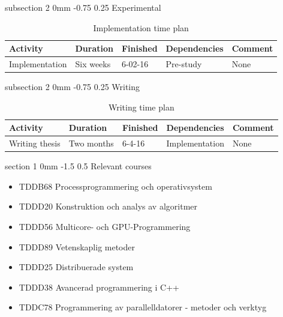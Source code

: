 \documentclass[a4paper,11pt]{article}
\makeatletter
\renewcommand{\section}{\@startsection
   {section}%
   {1}%
   {0mm}%
   {-1.5\baselineskip}%
   {0.5\baselineskip}%
   {\sffamily\bfseries\upshape\normalsize}}%
\renewcommand{\subsection}{\@startsection
   {subsection}%
   {2}%
   {0mm}%
   {-0.75\baselineskip}%
   {0.25\baselineskip}%
   {\rmfamily\normalfont\slshape\normalsize}}%
\makeatother
\begin{document}
\subsection{Experimental}
\begin{table}[H]
  \centering
  \begin{tabular}{|l|l|l|l|l|}
    \hline
    \textbf{Activity} & Duration & Finished & Dependencies & Comment  \\ \hline
    Implementation & Six weeks & 6-02-16 & Pre-study & None \\ \hline

  \end{tabular}
  \caption{Implementation time plan }
  \label{tab:funktion1}
\end{table}


\subsection{Writing}

\begin{table}[H]
  \centering
  \begin{tabular}{|l|l|l|l|l|}
    \hline
    \textbf{Activity} & Duration & Finished & Dependencies & Comment  \\ \hline
    Writing thesis & Two months & 6-4-16 & Implementation & None \\ \hline

  \end{tabular}
  \caption{Writing time plan }
  \label{tab:funktion1}
\end{table}

\section{Relevant courses}
\begin{itemize}
\item TDDB68	Processprogrammering och operativsystem
\item TDDD20	Konstruktion och analys av algoritmer
\item TDDD56	Multicore- och GPU-Programmering
\item TDDD89	Vetenskaplig metoder
\item TDDD25 	Distribuerade system
\item TDDD38 	Avancerad programmering i C++
\item TDDC78 	Programmering av parallelldatorer - metoder och verktyg
\end{itemize}
\end{document}
